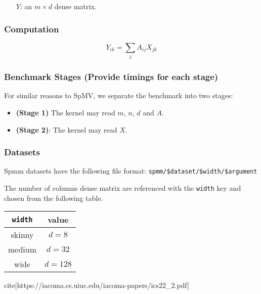 \documentclass{article}
\begin{document}
\begin{itemize}
	\item[$Y$:] an $m \times d$ dense matrix.
\end{itemize}

\subsubsection{Computation}

$$Y_{ik} = \sum_{j}A_{ij}X_{jk}$$

\subsubsection{Benchmark Stages (Provide timings for each stage)}

For similar reasons to SpMV, we separate the benchmark into two stages:

\begin{itemize}
\item \textbf{(Stage 1)}
	The kernel may read $m$, $n$, $d$ and $A$.
\item \textbf{(Stage 2)}:
	The kernel may read $X$.
\end{itemize}

\subsubsection{Datasets}

    Spmm datasets have the following file format:
    \texttt{spmm/\$dataset/\$width/\$argument}

    The number of columns dense matrix are referenced with the \texttt{width} key and chosen from the following table.
    
    \begin{tabular}{|c|c|}\hline
        \texttt{width} & value\\
        \hline
        skinny & $d = 8$\\
        medium & $d = 32$\\
        wide & $d = 128$\\\hline
    \end{tabular}

cite[https://iacoma.cs.uiuc.edu/iacoma-papers/ics22_2.pdf]
\end{document}
